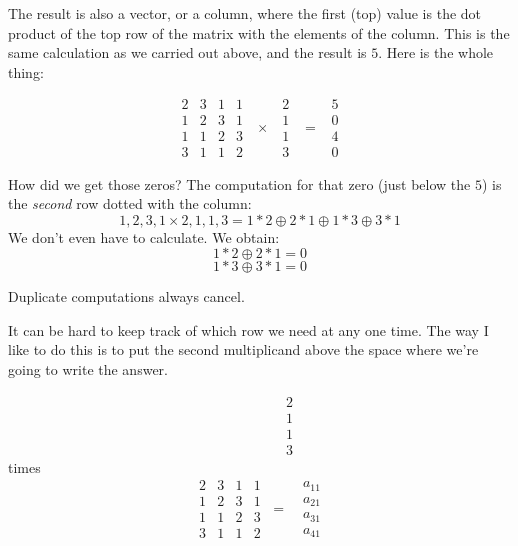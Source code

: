 \documentclass[11pt, oneside]{article}
\begin{document}
The result is also a vector, or a column, where the first (top) value is the dot product of the top row of the matrix with the elements of the column.  This is the same calculation as we carried out above, and the result is $5$.  Here is the whole thing:

\[
\begin{matrix}
2 & 3 & 1 & 1 \\
1 & 2 & 3 & 1 \\
1 & 1 & 2 & 3 \\
3 & 1 & 1 & 2
\end{matrix}
\ \ \times \ \ 
\begin{matrix}
2 \\
1 \\
1 \\
3 
\end{matrix}
\ \ = \ \ 
\begin{matrix}
5 \\
0 \\
4 \\
0 
\end{matrix}
\]

How did we get those zeros?  The computation for that zero (just below the $5$) is the \emph{second} row dotted with the column:
\[ 1,2,3,1 \times 2,1,1,3 = 1 * 2 \oplus 2 * 1 \oplus 1 * 3 \oplus 3 * 1 \]
We don't even have to calculate.  We obtain:
\[ 1 * 2 \oplus 2 * 1 = 0 \]
\[ 1 * 3 \oplus 3 * 1 = 0 \]

Duplicate computations always cancel.

It can be hard to keep track of which row we need at any one time.  The way I like to do this is to put the second multiplicand above the space where we're going to write the answer.

\[ \ \ \ \ \ \ \ \ \ \ \ \ \ \  \ \ \ \ \ 
\begin{matrix}
2 \\
1 \\
1 \\
3 
\end{matrix}
\]
times
\[
\begin{matrix}
2 & 3 & 1 & 1 \\
1 & 2 & 3 & 1 \\
1 & 1 & 2 & 3 \\
3 & 1 & 1 & 2
\end{matrix}
\ = \ \ \
\begin{matrix}
a_{11} \\
a_{21} \\
a_{31} \\
a_{41} 
\end{matrix}
\]
\end{document}
